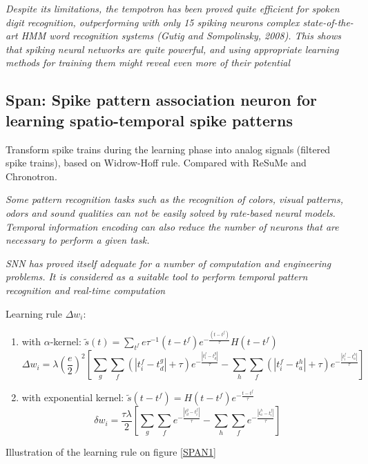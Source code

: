 \documentclass[12pt]{article}
\begin{document}
\textit{Despite its limitations, the tempotron has been proved quite efficient for spoken digit recognition, outperforming with only 15 spiking neurons complex state-of-the-art HMM word recognition systems (Gutig and Sompolinsky, 2008). This shows that spiking neural networks are quite powerful, and using appropriate learning methods for training them might reveal even more of their potential}

\subsection{Span: Spike pattern association neuron for learning spatio-temporal spike patterns \cite{mohemmed2012span}}
Transform spike trains during the learning phase into analog signals (filtered spike trains), based on Widrow-Hoff rule. Compared with ReSuMe and Chronotron.

\textit{Some pattern recognition tasks such as the recognition of colors, visual patterns, odors and sound qualities can not be easily solved by rate-based neural models. Temporal information encoding can also reduce the number of neurons that are necessary to perform a given task.}

\textit{SNN has proved itself adequate for a number of computation and engineering problems. It is considered as a suitable tool to perform temporal pattern recognition and real-time computation}

Learning rule $\Delta w_i$:
\begin{enumerate}
\item with $\alpha$-kernel: $ \widetilde{s}(t) = \sum\limits_{t^f} e \tau^{-1} (t-t^f) e^{-\frac{(t-t^f)}{\tau}} H(t-t^f) $
\begin{equation}
\Delta w_i = \lambda (\frac{e}{2})^2 \left[ \sum_g \sum_f (|t_i^f-t_d^g| + \tau)e^{-\frac{|t_i^f-t_d^g|}{\tau}} - \sum_h \sum_f (|t_i^f-t_a^h| + \tau)e^{-\frac{|t_i^f-t_a^h|}{\tau}} \right]
\end{equation}

\item with exponential kernel: $\widetilde{s}(t - t^f) = H(t-t^f)e^{-\frac{t-t^f}{\tau}}$
\begin{equation}
\delta w_i = \frac{\tau \lambda}{2} \left[ \sum_g \sum_f e^{-\frac{|t_d^g-t_i^f|}{\tau}} - \sum_h \sum_f e^{-\frac{|t_a^h-t_i^f|}{\tau}} \right]
\end{equation}
\end{enumerate}

Illustration of the learning rule on figure \ref{SPAN1}
\end{document}
